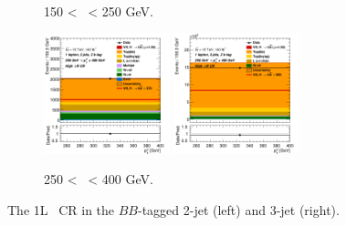 \begin{figure}[h!]
\begin{subfigure}[b]{\textwidth}
        \caption{150 < \ptv\ < 250 GeV.}
        \label{fig:plots_VHbb_1L_150_CRH}
    \end{subfigure}
    \begin{subfigure}[b]{\textwidth}
        \centering
        \includegraphics[width=0.40\textwidth]{Images/VH/Own_fit/prefit_VHbb/Region_distpTV_BMax400_BMin250_DCRHigh_J2_TTypebb_T2_L1_Y6051_Prefit.png}
        \includegraphics[width=0.40\textwidth]{Images/VH/Own_fit/prefit_VHbb/Region_distpTV_BMax400_BMin250_DCRHigh_J3_TTypebb_T2_L1_Y6051_Prefit.png}
        \caption{250 < \ptv\ < 400 GeV.}
        \label{fig:plots_VHbb_1L_250_CRH}
    \end{subfigure}
    \caption{The 1L \highdr\ CR in the $BB$-tagged 2-jet (left) and 3-jet (right).}
    \label{fig:plots_VHbb_1L_CRH}
\end{figure} 

\vspace*{\fill} \clearpage
\vspace*{\fill}



